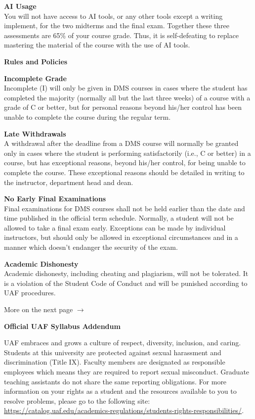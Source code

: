 \documentclass[12pt]{article}
\renewcommand{\emph}[1]{\textsf{\textbf{#1}}}
\newcommand{\localhead}[1]{\par\smallskip\textbf{#1} \smallskip\nobreak\\}%
\def\heading#1{\localhead{\large\emph{#1}}}
\def\subheading#1{\localhead{\emph{#1}}}
\begin{document}
\heading{AI Usage}
You will not have access to AI tools, or any other tools except a writing implement, for the two midterms and the final exam. Together these three assessments are 65\% of your course grade. Thus, it is self-defeating to replace mastering the material of the course with the use of AI tools.

\heading{Rules and Policies}
\vskip -20pt
\subheading{Incomplete Grade} 
Incomplete (I) will only be given in
  DMS courses in cases where
  the student has completed the majority (normally all but the last
  three weeks) of a course with a grade of C or better, but for
  personal reasons beyond his/her control has been unable to complete
  the course during the regular term.  

\subheading{Late Withdrawals} 
A withdrawal after the deadline from a DMS course will
  normally be granted only in cases where the student is performing
  satisfactorily (i.e., C or better) in a course, but has exceptional
  reasons, beyond his/her control, for being unable to complete the
  course. These exceptional reasons should be detailed in writing to
  the instructor, department head and dean.

\subheading{No Early Final Examinations}
Final examinations for DMS
  courses shall not be held earlier than the date and time published
  in the official term schedule. Normally, a student will not be
  allowed to take a final exam early. Exceptions can be made by
  individual instructors, but should only be allowed in exceptional
  circumstances and in a manner which doesn't endanger the security of
  the exam.

\subheading{Academic Dishonesty}
Academic dishonesty, including cheating and plagiarism, will not
be tolerated.  It is a violation of the Student Code of Conduct
and will be punished according to UAF procedures.

\vfill

{\Large{More on the next page $\longrightarrow$}}

\newpage

\begin{center}
\textbf{\large{Official UAF Syllabus Addendum}}
\end{center}


 UAF embraces and grows a culture of respect, diversity, inclusion, and caring. Students at this university are protected against sexual harassment and discrimination (Title IX). Faculty members are designated as responsible employees which means they are required to report sexual misconduct. Graduate teaching assistants do not share the same reporting obligations. For more information on your rights as a student and the resources available to you to resolve problems, please go to the following site: \\
\url{https://catalog.uaf.edu/academics-regulations/students-rights-responsibilities/}.
\end{document}
